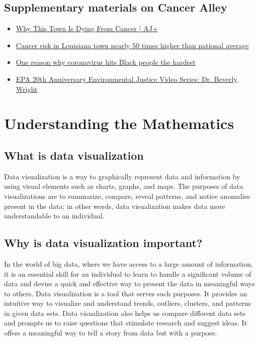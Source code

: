 \documentclass[a4paper, 11pt]{article}
\begin{document}
\subsection{Supplementary materials on Cancer Alley}
%
	\begin{itemize}[noitemsep]
		\item \href{https://www.youtube.com/watch?v=ZB8CbDG7gpk}{Why This Town Is Dying From Cancer | AJ+}
		\item \href{https://www.youtube.com/watch?v=MGNtMkFJkKg}{Cancer risk in Louisiana town nearly 50 times higher than national average}
		\item \href{https://www.youtube.com/watch?v=XAFD-0aMkwE}{One reason why coronavirus hits Black people the hardest}
		\item \href{https://www.youtube.com/watch?v=9hE3SyXr9bw}{EPA 20th Anniversary Environmental Justice Video Series: Dr. Beverly Wright}
	\end{itemize}
%
%
%
%
\section{Understanding the Mathematics}
%
%
\subsection{What is data visualization}
%
	Data visualization is a way to graphically represent data and information by using visual elements such as charts, graphs, and maps. The purposes of data visualizations are to summarize, compare, reveal patterns, and notice anomalies present in the data; in other words, data visualization makes data more understandable to an individual.
%
%
\subsection{Why is data visualization important?}
%
	In the world of big data, where we have access to a large amount of information, it is an essential skill for an individual to learn to handle a significant volume of data and devise a quick and effective way to present the data in meaningful ways to others. Data visualization is a tool that serves such purposes. It provides an intuitive way to visualize and understand trends, outliers, clusters, and patterns in given data sets. Data visualization also helps us compare different data sets and prompts us to raise questions that stimulate research and suggest ideas. It offers a meaningful way to tell a story from data but with a purpose.
%
%
\end{document}
